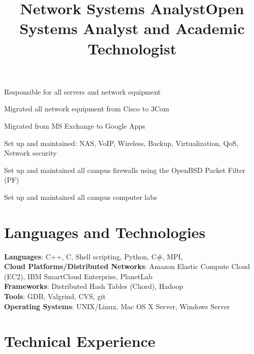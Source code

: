 \documentclass[margin,line]{resume}
\begin{document}
\begin{resume}
    \title{\textbf{Network Systems Analyst}}
    \begin{position}
    \vspace{-2mm}
    \begin{list2}
    \item Responsible for all servers and network equipment
    \item Migrated all network equipment from Cisco to 3Com
    \item Migrated from MS Exchange to Google Apps
    \item Set up and maintained: NAS, VoIP, Wireless, Backup, Virtualization, QoS, Network security
    \end{list2}
    \end{position}
    \newpage
    \title{\textbf{Open Systems Analyst and Academic Technologist}}
    \begin{position}
    \vspace{-2mm}
    \begin{list2}
    \item Set up and maintained all campus firewalls using the OpenBSD Packet Filter (PF)
    \item Set up and maintained all campus computer labs
    \end{list2}
    \end{position}

    \section{\mysidestyle Languages and Technologies} 

    \textbf{Languages}: C++, C, Shell scripting, Python, C\#, MPI, \LaTeXe\\
    \textbf{Cloud Platforms/Distributed Networks}: Amazon Elastic Compute Cloud (EC2), IBM SmartCloud Enterprise, PlanetLab\\
    \textbf{Frameworks}: Distributed Hash Tables (Chord), Hadoop\\
    \textbf{Tools}: GDB, Valgrind, CVS, git\\
    \textbf{Operating Systems}: {\sc UNIX}/Linux, Mac OS X Server, Windows Server
    
    \section{\mysidestyle Technical Experience}
    

\end{resume}
\end{document}
